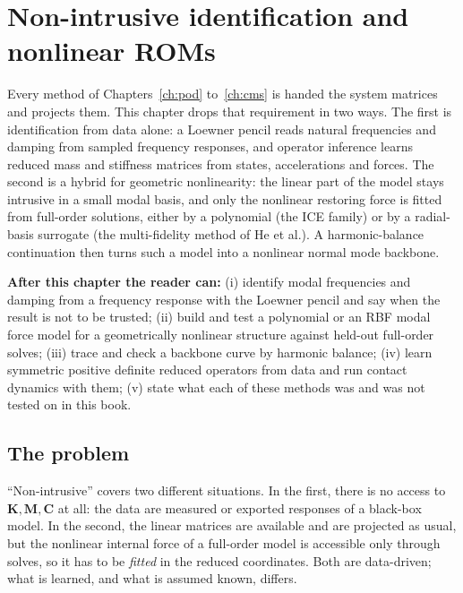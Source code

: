 \chapter{Non-intrusive identification and nonlinear ROMs}\label{ch:nonint}

\begin{tcolorbox}[colback=gray!5,colframe=gray!50,title={In this chapter}]
Every method of Chapters~\ref{ch:pod} to~\ref{ch:cms} is handed the system matrices and projects them. This chapter drops that requirement in two ways. The first is identification from data alone: a Loewner pencil reads natural frequencies and damping from sampled frequency responses, and operator inference learns reduced mass and stiffness matrices from states, accelerations and forces. The second is a hybrid for geometric nonlinearity: the linear part of the model stays intrusive in a small modal basis, and only the nonlinear restoring force is fitted from full-order solutions, either by a polynomial (the ICE family) or by a radial-basis surrogate (the multi-fidelity method of He et al.). A harmonic-balance continuation then turns such a model into a nonlinear normal mode backbone.\par\smallskip
\textbf{After this chapter the reader can:} (i) identify modal frequencies and damping from a frequency response with the Loewner pencil and say when the result is not to be trusted; (ii) build and test a polynomial or an RBF modal force model for a geometrically nonlinear structure against held-out full-order solves; (iii) trace and check a backbone curve by harmonic balance; (iv) learn symmetric positive definite reduced operators from data and run contact dynamics with them; (v) state what each of these methods was and was not tested on in this book.
\end{tcolorbox}

\section{The problem}\label{sec:ni-problem}

``Non-intrusive'' covers two different situations. In the first, there is no access to $\bm K,\bm M,\bm C$ at all: the data are measured or exported responses of a black-box model. In the second, the linear matrices are available and are projected as usual, but the nonlinear internal force of a full-order model is accessible only through solves, so it has to be \emph{fitted} in the reduced coordinates. Both are data-driven; what is learned, and what is assumed known, differs.

